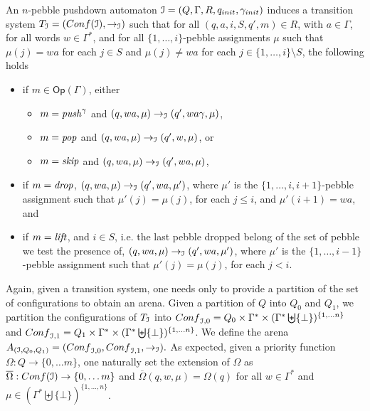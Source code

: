 \documentclass[a4paper,UKenglish,cleveref, autoref, thm-restate]{lipics-v2021}
\newcommand{\Conf}{\mathsf{Conf}}
\newcommand{\Op}{\mathsf{Op}}
\begin{document}
An $n$-pebble pushdown automaton $\mathcal{I} =  (Q, \Gamma,  R, q_{init}, {\gamma_{init}} )$ induces 
a transition system  $T_{\ppda} = (\Conf(\ppda), \rightarrow_{\ppda})$ 
 such that
for all $(q, a, i, S, q', m) \in R$, with $a \in \Gamma$,
 for all words $w \in  \Gamma^*$, and for all $\{ 1, \ldots , i \}$-pebble assignments $\mu$ such that $\mu(j) = wa$ 
 for each
$j \in S$ 	and
 $\mu(j) \neq wa$ 
 for each $j \in \{ 1, \ldots , i \} \setminus S$,
the following holds
\begin{itemize}
\item if $m \in \Op(\Gamma)$, 
either
\begin{itemize}
\item $ m = \text{\textit{push}}^\gamma$ and $(q,wa,\mu) \rightarrow_{\mathcal{I}} (q',wa\gamma, \mu)$,

\item $ m = \text{\textit{pop}}$ and $(q,wa,\mu) \rightarrow_{\mathcal{I}} (q',w, \mu)$, or

\item $ m = \text{\textit{skip}}$ and $(q,wa,\mu) \rightarrow_{\mathcal{I}} (q',wa, \mu)$,
\end{itemize}
\item if $ m = \text{\textit{drop}}$, 
$(q,wa,\mu) \rightarrow_{\mathcal{I}} (q',wa, \mu')$,  
where $\mu'$ is the $\{ 1, \ldots , i, i+1 \}$-pebble assignment such that
$\mu'(j) = \mu(j)$, for each
$j \leq i$, and $\mu'(i+1) = wa$, and
\item if $m = \text{\textit{lift}}$, and $i \in S$, i.e. the last pebble dropped belong of the set of pebble we test the presence of,
$(q,wa,\mu) \rightarrow_{\mathcal{I}} (q',wa, \mu')$, 
where $\mu'$ is the $\{ 1, \ldots , i - 1 \}$-pebble assignment such that
$\mu'(j) = \mu(j)$, for each
$j < i$.
\end{itemize}




Again, given
a 
 transition system, one needs only to provide 
a partition of the set of
configurations 
 to obtain an arena.
Given a partition of
$Q$ into $Q_0$ and $Q_1$, 
we partition the configurations of
$T_{\mathcal{I}}$
into
$\Conf_{\ppda,0}=Q_0\times \Gamma^* \times ( \Gamma^* \biguplus \{ \bot \})^{\{1, \ldots n\}}$
and
$\Conf_{\ppda,1}=Q_1\times  \Gamma^* \times ( \Gamma^* \biguplus \{ \bot \})^{\{1, \ldots n\}}$. 
We  define the arena
$
A_{(\ppda, Q_0 , Q_1)}
=
(\Conf_{\ppda,0}, \Conf_{\ppda,1}, \rightarrow_{\ppda}).$
As expected, given a 
priority function $\Omega: Q \to \{0, \ldots m\}$,
one naturally 
set the extension of $\Omega$ as
$\overline{\Omega}: \Conf(\ppda) \to \{0, \ldots m\}$
and
$\overline{\Omega}(q, w,\mu) = \Omega(q)$
for all
$w \in  \Gamma^*$
and
$\mu \in ( \Gamma^* \biguplus \{ \bot \})^{\{1, \ldots, n\}}$. \\
\end{document}
